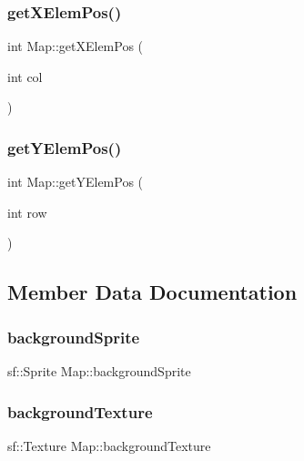 \subsubsection{\texorpdfstring{get\+X\+Elem\+Pos()}{getXElemPos()}}
{\footnotesize\ttfamily int Map\+::get\+X\+Elem\+Pos (\begin{DoxyParamCaption}\item[{int}]{col }\end{DoxyParamCaption})\hspace{0.3cm}{\ttfamily [protected]}}

\mbox{\label{class_map_a8efab6f1e807cb4cb576fc5dcfed3075}} 
\subsubsection{\texorpdfstring{get\+Y\+Elem\+Pos()}{getYElemPos()}}
{\footnotesize\ttfamily int Map\+::get\+Y\+Elem\+Pos (\begin{DoxyParamCaption}\item[{int}]{row }\end{DoxyParamCaption})\hspace{0.3cm}{\ttfamily [protected]}}



\subsection{Member Data Documentation}
\mbox{\label{class_map_aa92b0ecd899641e3385613efcd037f65}} 
\subsubsection{\texorpdfstring{background\+Sprite}{backgroundSprite}}
{\footnotesize\ttfamily sf\+::\+Sprite Map\+::background\+Sprite}

\mbox{\label{class_map_a18202f9ebc5ddab14652bdacc81e3c72}} 
\subsubsection{\texorpdfstring{background\+Texture}{backgroundTexture}}
{\footnotesize\ttfamily sf\+::\+Texture Map\+::background\+Texture}


